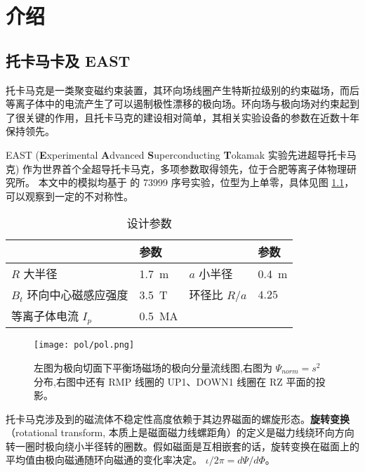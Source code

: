 \chapter{介绍}

\section{托卡马卡及 EAST}
托卡马克是一类聚变磁约束装置，其环向场线圈产生特斯拉级别的约束磁场，而后等离子体中的电流产生了可以遏制极性漂移的极向场。环向场与极向场对约束起到了很关键的作用，且托卡马克的建设相对简单，其相关实验设备的参数在近数十年保持领先。

EAST (\textbf{E}xperimental \textbf{A}dvanced \textbf{S}uperconducting \textbf{T}okamak 实验先进超导托卡马克) 作为世界首个全超导托卡马克，多项参数取得领先，位于合肥等离子体物理研究所。
本文中的模拟均基于 \east 的 73999 序号实验，位型为上单零，具体见图 \ref{fig:equili-73999}，可以观察到一定的不对称性。

\begin{table}[htb]
    \centering
    \caption{\east 设计参数}
    \label{tab:east_parameter}
    \begin{tabularx}{\linewidth}{lXlX}
        \toprule[1.5pt]
         & 参数 & & 参数\\
        \midrule[1pt]
        $R$ 大半径 &  \SI{1.7}{\meter} & $a$ 小半径 & \SI{0.4}{\meter}\\ 
        $B_t$ 环向中心磁感应强度 &  \SI{3.5}{\tesla} & 环径比 $R/a$ & $4.25$\\ 
        等离子体电流 $I_p$ & \SI{0.5}{\mega\ampere}&  &\\  %
        \bottomrule[1.5pt]
    \end{tabularx}
\end{table}



\begin{figure}[htbp]
  \centering%
  \texttt{[image: pol/pol.png]}
  \caption{左图为极向切面下平衡场磁场的极向分量流线图,右图为 $\Psi_{norm}=s^2$ 分布,右图中还有 RMP 线圈的 UP1、DOWN1 线圈在 RZ 平面的投影。}
  \label{fig:equili-73999}
\end{figure}



托卡马克涉及到的磁流体不稳定性高度依赖于其边界磁面的螺旋形态。\textbf{旋转变换}（rotational transform, 本质上是磁面磁力线螺距角）的定义是磁力线绕环向方向转一圈时极向绕小半径转的圈数。假如磁面是互相嵌套的话，旋转变换在磁面上的平均值由极向磁通随环向磁通的变化率决定。
$ \iota/2 \pi = d\Psi /d \Phi $。

